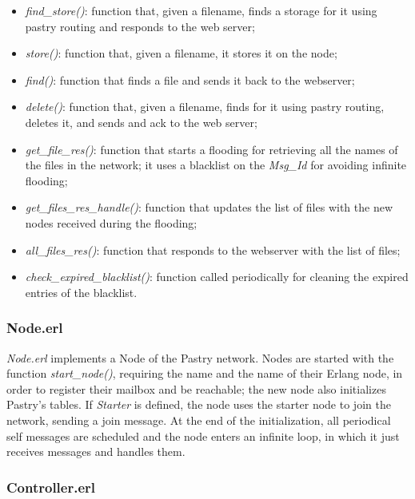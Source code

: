 \documentclass{article}
\begin{document}
\begin{itemize}
    \item \textit{find\_store()}: function that, given a filename, finds a storage for it using pastry routing and responds
    to the web server;
    \item \textit{store()}: function that, given a filename, it stores it on the node;
    \item \textit{find()}: function that finds a file and sends it back to the webserver;
    \item \textit{delete()}: function that, given a filename, finds for it using pastry routing, deletes it,
    and sends and ack to the web server;
    \item \textit{get\_file\_res()}: function that starts a flooding for retrieving all the names of the files
    in the network; it uses a blacklist on the \textit{Msg\_Id} for avoiding infinite flooding; 
    \item \textit{get\_files\_res\_handle()}: function that updates the list of files with the new nodes received during the flooding;
    \item \textit{all\_files\_res()}: function that responds to the webserver with the list of files;
    \item \textit{check\_expired\_blacklist()}: function called periodically for cleaning the expired entries of the blacklist.
\end{itemize}



\subsubsection{Node.erl}

\textit{Node.erl} implements a Node of the Pastry network. Nodes are started with the function \textit{start\_node()}, requiring the name
and the name of their Erlang node, in order to register their mailbox and be reachable; the new node also initializes Pastry's tables.
If \textit{Starter} is defined, the node uses the starter node to join the network, sending a join message.
At the end of the initialization, all periodical self messages are scheduled and the node enters an infinite loop, in which it just receives
messages and handles them.

\subsubsection{Controller.erl}
\end{document}

